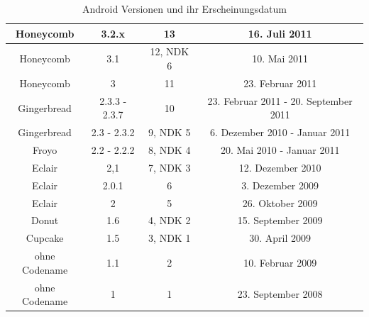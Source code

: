 \begin{table}[htbp]
{\begin{tabular}{|c|c|c|c|}
			Honeycomb                                & 3.2.x                                   & 13                                        & 16. Juli 2011                                     \\ \hline
			Honeycomb                                & 3.1                                     & 12, NDK 6                                 & 10. Mai 2011                                      \\ \hline
			Honeycomb                                & 3                                       & 11                                        & 23. Februar 2011                                  \\ \hline
			Gingerbread                              & 2.3.3 - 2.3.7                           & 10                                        & 23. Februar 2011 - 20. September 2011             \\ \hline
			Gingerbread                              & 2.3 - 2.3.2                             & 9, NDK 5                                  & 6. Dezember 2010 - Januar 2011                    \\ \hline
			Froyo                                    & 2.2 - 2.2.2                             & 8, NDK 4                                  & 20. Mai 2010 - Januar 2011                        \\ \hline
			Eclair                                   & 2,1                                     & 7, NDK 3                                  & 12. Dezember 2010                                 \\ \hline
			Eclair                                   & 2.0.1                                   & 6                                         & 3. Dezember 2009                                  \\ \hline
			Eclair                                   & 2                                       & 5                                         & 26. Oktober 2009                                  \\ \hline
			Donut                                    & 1.6                                     & 4, NDK 2                                  & 15. September 2009                                \\ \hline
			Cupcake                                  & 1.5                                     & 3, NDK 1                                  & 30. April 2009                                    \\ \hline
			ohne Codename                            & 1.1                                     & 2                                         & 10. Februar 2009                                  \\ \hline
			ohne Codename                            & 1                                       & 1                                         & 23. September 2008                                \\ \hline
		\end{tabular}
	}
	\caption{Android Versionen und ihr Erscheinungsdatum}\label{tab_android_vers}\citep{android_codenames,android_version_releases}
\end{table}
\clearpage

